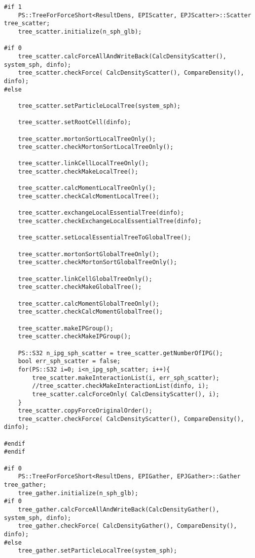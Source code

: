 \begin{lstlisting}[caption=開放境界、モートンソート、ローカルツリー構築、モーメント計算、LET交換、グローバルツリー構築、相互作用計算のテスト]
#if 1
    PS::TreeForForceShort<ResultDens, EPIScatter, EPJScatter>::Scatter tree_scatter;
    tree_scatter.initialize(n_sph_glb);

#if 0
    tree_scatter.calcForceAllAndWriteBack(CalcDensityScatter(), system_sph, dinfo);
    tree_scatter.checkForce( CalcDensityScatter(), CompareDensity(), dinfo);
#else

    tree_scatter.setParticleLocalTree(system_sph);

    tree_scatter.setRootCell(dinfo);

    tree_scatter.mortonSortLocalTreeOnly();
    tree_scatter.checkMortonSortLocalTreeOnly();

    tree_scatter.linkCellLocalTreeOnly();
    tree_scatter.checkMakeLocalTree();

    tree_scatter.calcMomentLocalTreeOnly();
    tree_scatter.checkCalcMomentLocalTree();

    tree_scatter.exchangeLocalEssentialTree(dinfo);
    tree_scatter.checkExchangeLocalEssentialTree(dinfo);

    tree_scatter.setLocalEssentialTreeToGlobalTree();

    tree_scatter.mortonSortGlobalTreeOnly();
    tree_scatter.checkMortonSortGlobalTreeOnly();

    tree_scatter.linkCellGlobalTreeOnly();
    tree_scatter.checkMakeGlobalTree();

    tree_scatter.calcMomentGlobalTreeOnly();
    tree_scatter.checkCalcMomentGlobalTree();

    tree_scatter.makeIPGroup();
    tree_scatter.checkMakeIPGroup();

    PS::S32 n_ipg_sph_scatter = tree_scatter.getNumberOfIPG();
    bool err_sph_scatter = false;
    for(PS::S32 i=0; i<n_ipg_sph_scatter; i++){
        tree_scatter.makeInteractionList(i, err_sph_scatter);
        //tree_scatter.checkMakeInteractionList(dinfo, i);
        tree_scatter.calcForceOnly( CalcDensityScatter(), i);
    }
    tree_scatter.copyForceOriginalOrder();
    tree_scatter.checkForce( CalcDensityScatter(), CompareDensity(), dinfo);

#endif
#endif

#if 0
    PS::TreeForForceShort<ResultDens, EPIGather, EPJGather>::Gather tree_gather;
    tree_gather.initialize(n_sph_glb);
#if 0
    tree_gather.calcForceAllAndWriteBack(CalcDensityGather(), system_sph, dinfo);
    tree_gather.checkForce( CalcDensityGather(), CompareDensity(), dinfo);
#else
    tree_gather.setParticleLocalTree(system_sph);


\end{lstlisting}
